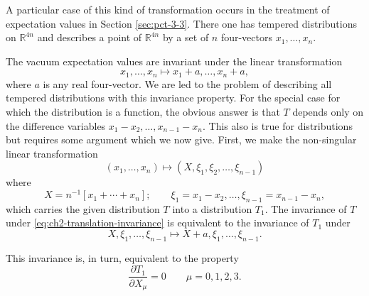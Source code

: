 A particular case of this kind of transformation occurs in the treatment of
expectation values in Section \ref{sec:pct-3-3}. There one has tempered distributions on
$\mathbb{R}^{4n}$ and describes a point of $\mathbb{R}^{4n}$ by a set of $n$
four-vectors $x_1,\ldots,x_n$.

The vacuum expectation values are invariant under the linear transformation
\begin{equation}
  x_1,\ldots,x_n\longmapsto x_1+a,\ldots,x_n+a,
\tag{2-18}\label{eq:ch2-translation-invariance}
\end{equation}
where $a$ is any real four-vector. We are led to the problem of describing all
tempered distributions with this invariance property. For the special case for
which the distribution is a function, the obvious answer is that $T$ depends
only on the difference variables $x_1-x_2,\ldots,x_{n-1}-x_n$. This also is
true for distributions but requires some argument which we now give. First, we
make the non-singular linear transformation
\begin{equation*}
  (x_1,\ldots,x_n)\longmapsto(X,\xi_1,\xi_2,\ldots,\xi_{n-1})
\end{equation*}
where
\begin{equation}
  X=n^{-1}[x_1+\cdots+x_n];\qquad
  \xi_1=x_1-x_2,\ldots,\xi_{n-1}=x_{n-1}-x_n,
\tag{2-19}\label{eq:ch2-center-difference-coordinates}
\end{equation}
which carries the given distribution $T$ into a distribution $T_1$. The
invariance of $T$ under \eqref{eq:ch2-translation-invariance} is equivalent to the invariance of $T_1$ under
\begin{equation}
  X,\xi_1,\ldots,\xi_{n-1}\longmapsto
  X+a,\xi_1,\ldots,\xi_{n-1}.
\tag{2-20}\label{eq:ch2-center-translation}
\end{equation}

This invariance is, in turn, equivalent to the property
\begin{equation}
  \frac{\partial T_1}{\partial X_\mu}=0\qquad \mu=0,1,2,3.
\tag{2-21}\label{eq:ch2-center-derivative}
\end{equation}


